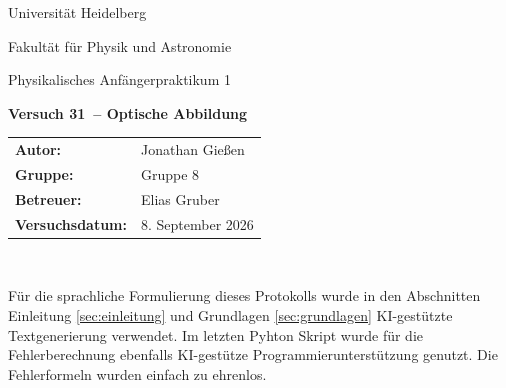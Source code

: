 \documentclass[12pt,a4paper,titlepage]{scrartcl}
\numberwithin{equation}{section}
\numberwithin{table}{section}
\numberwithin{figure}{section}
\newcommand{\versuch}{Versuch 31}
\newcommand{\titel}{Optische Abbildung}
\newcommand{\praktikum}{Physikalisches Anfängerpraktikum 1}
\newcommand{\autor}{Jonathan Gießen}
\newcommand{\gruppe}{Gruppe 8}
\newcommand{\datum}{8. September 2026}
\newcommand{\betreuer}{Elias Gruber}
\begin{document}
\pagestyle{scrheadings}

\begin{titlepage}



    \centering
    \vspace*{4cm}
    {\large Universität Heidelberg\par}
    {\small Fakultät für Physik und Astronomie\par}
    {\Large \praktikum\par}
    \vspace{0.8cm}
    {\LARGE \bfseries \versuch\ -- \titel\par}
    \vspace{1.5cm}

    \begin{tabular}{ll}
        \textbf{Autor:} & \autor\\
        \textbf{Gruppe:} & \gruppe\\
        \textbf{Betreuer:} & \betreuer\\
        \textbf{Versuchsdatum:} & \datum\\
    \end{tabular}

    \vfill
    \hrulefill\
\end{titlepage}

\tableofcontents

\bigskip
\begin{tcolorbox}[colback=gray!5,colframe=gray!60,boxrule=0.8pt,arc=0.01mm,title=KI-Hinweis]
    Für die sprachliche Formulierung dieses Protokolls wurde in den Abschnitten Einleitung \ref{sec:einleitung} und Grundlagen \ref{sec:grundlagen} KI-gestützte Textgenerierung verwendet. Im letzten Pyhton Skript wurde für die Fehlerberechnung ebenfalls KI-gestütze Programmierunterstützung genutzt. Die Fehlerformeln wurden einfach zu ehrenlos.
\end{tcolorbox}


\clearpage
\end{document}
